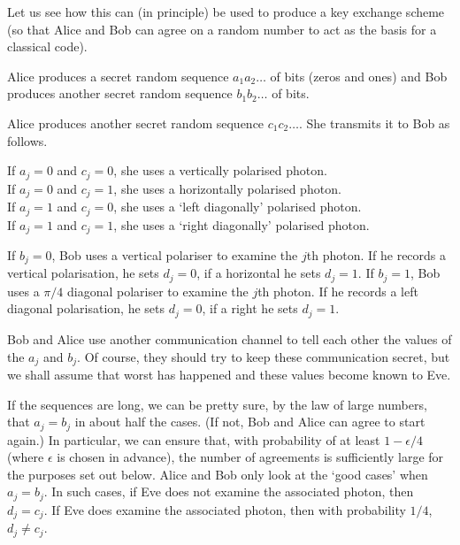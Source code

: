 \documentclass[12pt,a4paper]{article}
\theoremstyle{plain}
\theoremstyle{definition}
\begin{document}
    Let us see how this can (in principle) be used
    to produce a key exchange scheme
    (so that Alice and Bob can agree on a random number
    to act as the basis for a classical code).

     Alice produces a secret
    random sequence $a_{1}a_{2}\dots$ of bits (zeros and ones)
    and Bob produces another secret
    random sequence $b_{1}b_{2}\dots$ of bits.

     Alice produces another
    secret
    random sequence $c_{1}c_{2}\dots$.
    She transmits it to Bob as follows.
    \begin{center}
        If $a_{j}=0$ and $c_{j}=0$, she uses a vertically polarised photon.\\
        If $a_{j}=0$ and $c_{j}=1$, she uses a horizontally polarised photon.\\
        If $a_{j}=1$ and $c_{j}=0$, she uses a `left diagonally' polarised photon.\\
        If $a_{j}=1$ and $c_{j}=1$, she uses a `right diagonally' polarised photon.
    \end{center}

     If $b_{j}=0$, Bob uses a vertical polariser
    to examine the $j$th photon. If he records a vertical polarisation,
    he sets  $d_{j}=0$, if a horizontal he sets $d_{j}=1$.
    If $b_{j}=1$, Bob uses a $\pi/4$ diagonal polariser
    to examine the $j$th photon. If he records a left diagonal polarisation,
    he sets  $d_{j}=0$, if a right he sets $d_{j}=1$.

     Bob and Alice use another communication
    channel to tell each other the values of the $a_{j}$ and
    $b_{j}$. Of course, they should try to keep these communication
    secret, but we shall assume that worst has happened and
    these values become known to Eve.

     If the sequences are long, we can be pretty sure,
    by the law of large numbers, that $a_{j}=b_{j}$ in about half the cases.
    (If not, Bob and Alice can agree to start again.)
    In particular, we can ensure that, with probability of at least
    $1-\epsilon/4$ (where $\epsilon$ is chosen in advance),
    the number of agreements is sufficiently
    large for the purposes set out below.
    Alice
    and Bob only look at the `good cases' when $a_{j}=b_{j}$.
    In such cases, if Eve does not examine the associated photon,
    then $d_{j}=c_{j}$. If Eve does examine the associated photon,
    then with probability $1/4$, $d_{j}\neq c_{j}$.
\end{document}
